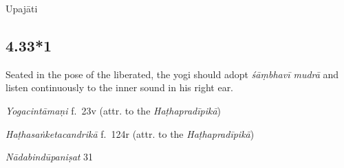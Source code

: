 \begin{ekdosis}
\begin{testimonia}[hp04_033]
\end{testimonia}


\begin{metre}[hp04_033]
Upajāti
\end{metre}

\subsection*{4.33*1}
\begin{translation}[hp04_033_1]
Seated in the pose of the liberated, the yogi should adopt \emph{śāṃbhavī mudrā} and listen continuously to the inner sound in his right ear.
\end{translation}


\begin{testimonia}[hp04_033_1]
\emph{Yogacintāmaṇi} f.~23v (attr. to the \emph{Haṭhapradīpikā})
\begin{versinnote}
\end{versinnote}

\emph{Haṭhasaṅketacandrikā} f.~124r (attr. to the \emph{Haṭhapradīpikā})
\begin{versinnote}
\tl{\var{dakṣiṇe karṇe ] B220,  dakṣirṇe 2244}\\!}
\end{versinnote}

\emph{Nādabindūpaniṣat} 31
\begin{versinnote}
\end{versinnote}
\end{testimonia}


\end{ekdosis}
